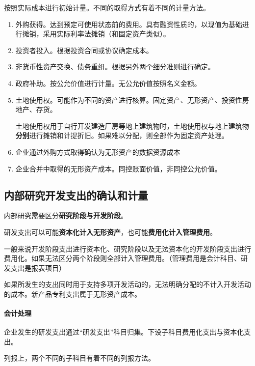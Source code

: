 \documentclass[UTF8,12pt]{ctexart}
\numberwithin{equation}{section} %
\numberwithin{figure}{section}
\numberwithin{table}{section}
\begin{document}
	按照实际成本进行初始计量。不同的取得方式有着不同的计量方法。
	\begin{enumerate}
		\item 外购获得。达到预定可使用状态前的费用。具有融资性质的，以现值为基础进行摊销，采用实际利率法摊销（和固定资产类似）。
		
		\item 投资者投入。根据投资合同或协议确定成本。
		
		\item 非货币性资产交换、债务重组。根据另外两个细分准则进行确定。
		
		\item 政府补助。按公允价值进行计量。无公允价值按照名义金额。
		
		\item 土地使用权。可能作为不同的资产进行核算。固定资产、无形资产、投资性房地产、存货。
		
		土地使用权用于自行开发建造厂房等地上建筑物时，土地使用权与地上建筑物\textbf{分别}进行摊销和计提折旧。如果难以分配，则全部作为固定资产处理。
		
		\item 企业通过外购方式取得确认为无形资产的数据资源成本
		
		\item 企业合并中取得的无形资产成本。同控账面价值，非同控公允价值。
	\end{enumerate}
	
	\subsection{内部研究开发支出的确认和计量}
	内部研究需要区分\textbf{研究阶段与开发阶段}。
	
	研发支出可以可能\textbf{资本化计入无形资产}，也可能\textbf{费用化计入管理费用}。
	
	一般来说开发阶段支出进行资本化、研究阶段以及无法资本化的开发阶段支出进行费用化。如果无法区分两个阶段则全部计入管理费用。（管理费用是会计科目、研发支出是报表项目）
	
	如果所发生的支出同时用于支持多项开发活动的，无法明确分配的不计入开发活动的成本。新产品专利支出属于无形资产成本。
	
	\paragraph{会计处理}
	企业发生的研发支出通过“研发支出”科目归集。下设子科目费用化支出与资本化支出。
	
	列报上，两个不同的子科目有着不同的列报方法。
	
\end{document}
